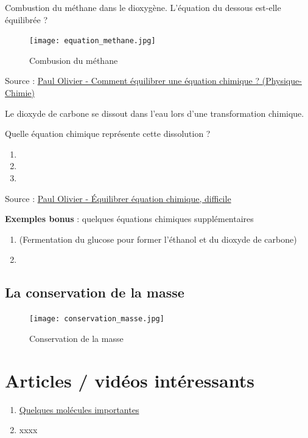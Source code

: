 \documentclass[a4paper,12pt]{article}
\begin{document}
\begin{tcolorbox}[colback=blue!10!white, colframe=blue!75!black, title=Exemples - Application]
  Combustion du méthane dans le dioxygène. L'équation du dessous est-elle équilibrée ?
  \begin{figure}[H]
    \centering
    \texttt{[image: equation\_methane.jpg]}
    \caption{\label{} Combusion du méthane}
  \end{figure}

  Source : \href{https://www.youtube.com/watch?v=VZVBS4OwwlE&ab_channel=PaulOlivier}{Paul Olivier - Comment équilibrer une équation chimique ? (Physique-Chimie)} \par
  \vspace{1em}
  
  Le dioxyde de carbone se dissout dans l'eau lors d'une transformation chimique. \par
  Quelle équation chimique représente cette dissolution ?

  \begin{enumerate}[noitemsep]
    \item {}
    \item {}
    \item {}
  \end{enumerate}

  Source : \href{https://www.youtube.com/watch?v=KRimPPjL9xg&ab_channel=PaulOlivier}{Paul Olivier - Équilibrer équation chimique, difficile } \par

  \textbf{Exemples bonus} : quelques équations chimiques supplémentaires

  \begin{enumerate}[noitemsep]
    \item {} (Fermentation du glucose pour former l'éthanol et du dioxyde de carbone)
    \item {}
  \end{enumerate}

\end{tcolorbox}

\subsection{La conservation de la masse}

\begin{figure}[H]
  \centering
  \texttt{[image: conservation\_masse.jpg]}
  \caption{\label{} Conservation de la masse}
\end{figure}

\section{Articles / vidéos intéressants}

\begin{enumerate}[noitemsep]
  \item \href{https://www.superprof.fr/ressources/physique-chimie/physique-chimie-tous-niveaux/formule-chimique-scientifique.html}{Quelques molécules importantes}
  \item xxxx
\end{enumerate}
\end{document}
